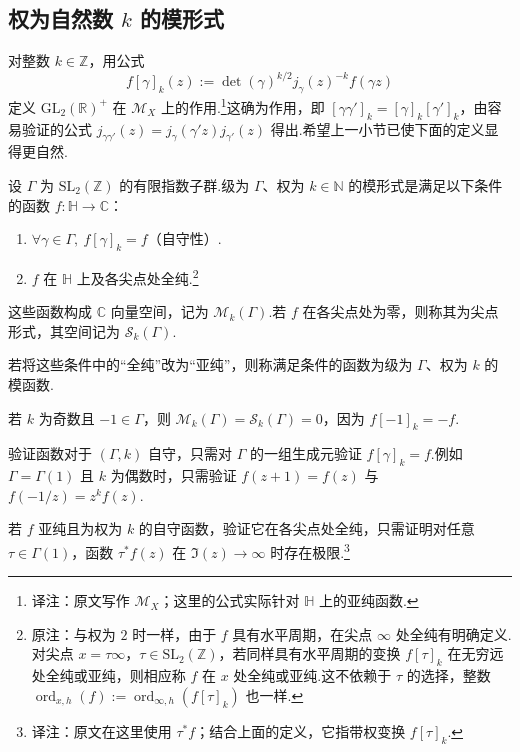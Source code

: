 \subsection{权为自然数 $k$ 的模形式}\label{sec:modular-1-2-3}
对整数 $k\in\mathbb Z$，用公式
\[
f[\gamma]_k(z):=\det(\gamma)^{k/2}j_\gamma(z)^{-k}f(\gamma z)
\]
定义 $\mathrm{GL}_2(\mathbb R)^+$ 在 $\mathcal M_X$ 上的作用.\footnote{译注：原文写作 $\mathcal M_X$；这里的公式实际针对 $\mathbb H$ 上的亚纯函数.}这确为作用，即 $[\gamma\gamma']_k=[\gamma]_k[\gamma']_k$，由容易验证的公式 $j_{\gamma\gamma'}(z)=j_\gamma(\gamma'z)j_{\gamma'}(z)$ 得出.希望上一小节已使下面的定义显得更自然.
\begin{definition*}
设 $\Gamma$ 为 $\mathrm{SL}_2(\mathbb Z)$ 的有限指数子群.级为 $\Gamma$、权为 $k\in\mathbb N$ 的模形式是满足以下条件的函数 $f:\mathbb H\longrightarrow\mathbb C$：
\begin{enumerate}[label=\roman*)]
\item $\forall\gamma\in\Gamma,\ f[\gamma]_k=f$（自守性）.
\item $f$ 在 $\mathbb H$ 上及各尖点处全纯.\footnote{原注：与权为 $2$ 时一样，由于 $f$ 具有水平周期，在尖点 $\infty$ 处全纯有明确定义.对尖点 $x=\tau\infty$，$\tau\in\mathrm{SL}_2(\mathbb Z)$，若同样具有水平周期的变换 $f[\tau]_k$ 在无穷远处全纯或亚纯，则相应称 $f$ 在 $x$ 处全纯或亚纯.这不依赖于 $\tau$ 的选择，整数 $\operatorname{ord}_{x,h}(f):=\operatorname{ord}_{\infty,h}(f[\tau]_k)$ 也一样.}
\end{enumerate}
这些函数构成 $\mathbb C$ 向量空间，记为 $\mathcal M_k(\Gamma)$.若 $f$ 在各尖点处为零，则称其为尖点形式，其空间记为 $\mathcal S_k(\Gamma)$.
\end{definition*}
若将这些条件中的``全纯''改为``亚纯''，则称满足条件的函数为级为 $\Gamma$、权为 $k$ 的模函数.
\begin{remark*}
若 $k$ 为奇数且 $-1\in\Gamma$，则 $\mathcal M_k(\Gamma)=\mathcal S_k(\Gamma)=0$，因为 $f[-1]_k=-f$.
\end{remark*}
\begin{remark*}
验证函数对于 $(\Gamma,k)$ 自守，只需对 $\Gamma$ 的一组生成元验证 $f[\gamma]_k=f$.例如 $\Gamma=\Gamma(1)$ 且 $k$ 为偶数时，只需验证 $f(z+1)=f(z)$ 与 $f(-1/z)=z^kf(z)$.
\end{remark*}
\begin{remark*}
若 $f$ 亚纯且为权为 $k$ 的自守函数，验证它在各尖点处全纯，只需证明对任意 $\tau\in\Gamma(1)$，函数 $\tau^*f(z)$ 在 $\Im(z)\to\infty$ 时存在极限.\footnote{译注：原文在这里使用 $\tau^*f$；结合上面的定义，它指带权变换 $f[\tau]_k$.}
\end{remark*}
